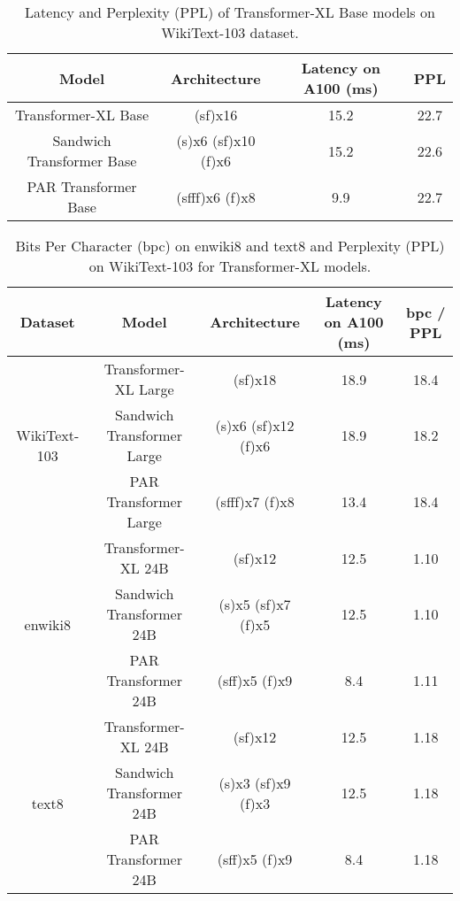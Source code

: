 \documentclass{article}
\begin{document}
\begin{table}[hbt!]
    \centering
     \begin{tabular}{||c c c c||} 
     \hline
    Model & Architecture & Latency on A100 (ms) & PPL \\ [0.5ex] 
     \hline\hline
     Transformer-XL Base & (sf)x16 & 15.2 & 22.7 \\ [1ex] 
     Sandwich Transformer Base & (s)x6 (sf)x10 (f)x6 & 15.2 & 22.6 \\ [1ex]
     PAR Transformer Base & (sfff)x6 (f)x8 & 9.9 & 22.7 \\ [1ex] 
     \hline\hline
    \end{tabular}
    \captionsetup{justification=centering}
    \caption{Latency and Perplexity (PPL) of Transformer-XL Base models on WikiText-103 dataset.}
    \label{table:wiki103_results}
\end{table}

\begin{table}[hbt!]
    \centering
     \begin{tabular}{||c c c c c||} 
     \hline
    Dataset & Model & Architecture & Latency on A100 (ms) & bpc / PPL \\ [0.5ex] 
     \hline\hline
    \multirow{3}{*}{WikiText-103} & Transformer-XL Large & (sf)x18 & 18.9 & 18.4 \\ [1ex] 
     & Sandwich Transformer Large & (s)x6 (sf)x12 (f)x6 & 18.9 & 18.2 \\ [1ex]
     & PAR Transformer Large & (sfff)x7 (f)x8 & 13.4 & 18.4 \\ [1ex] 
     \hline\hline
     \multirow{3}{*}{enwiki8} & Transformer-XL 24B & (sf)x12 & 12.5 & 1.10 \\ [1ex] 
     & Sandwich Transformer 24B & (s)x5 (sf)x7 (f)x5 & 12.5 & 1.10 \\ [1ex]
     & PAR Transformer 24B & (sff)x5 (f)x9 & 8.4 & 1.11 \\ [1ex] 
     \hline\hline
    \multirow{3}{*}{text8} & Transformer-XL 24B & (sf)x12 & 12.5 & 1.18 \\ [1ex] 
     & Sandwich Transformer 24B & (s)x3 (sf)x9 (f)x3 & 12.5 & 1.18 \\ [1ex]
     & PAR Transformer 24B & (sff)x5 (f)x9 & 8.4 & 1.18 \\ [1ex] 
     \hline
    \end{tabular}
    \captionsetup{justification=centering}
    \caption{Bits Per Character (bpc) on enwiki8 and text8 and Perplexity (PPL) on WikiText-103 for Transformer-XL models.}
    \label{table:otherdata_results}
\end{table}
\end{document}

